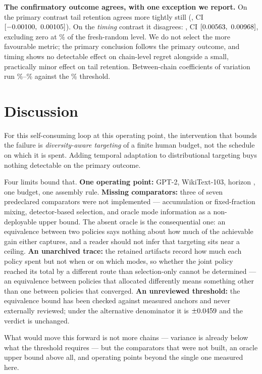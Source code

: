 \documentclass{article}
\begin{document}
\textbf{The confirmatory outcome agrees, with one exception we report.} On the primary
contrast tail retention agrees more tightly still (\PilotTailPrimaryMean{},
CI $[\PilotTailPrimaryLow,\allowbreak\ \PilotTailPrimaryHigh]$). On the \emph{timing}
contrast it disagrees: \PilotTailSchedRandMean{},
CI $[\PilotTailSchedRandLow,\allowbreak\ \PilotTailSchedRandHigh]$, excluding zero at
\PilotTailSchedRandPct\% of the fresh-random level. We do not select the more favourable
metric; the primary conclusion follows the primary outcome, and timing shows no detectable
effect on chain-level regret alongside a small, practically minor effect on tail retention.
Between-chain coefficients of variation run \PilotCVLow\%--\PilotCVHigh\% against the
\PilotThresholdPct\% threshold.

\section{Discussion}
\label{sec:discussion}

For this self-consuming loop at this operating point, the intervention that bounds the
failure is \emph{diversity-aware targeting} of a finite human budget, not the schedule on
which it is spent. Adding temporal adaptation to distributional targeting buys nothing
detectable on the primary outcome.

Four limits bound that. \textbf{One operating point:} GPT-2, WikiText-103, horizon
\PilotHorizon{}, one budget, one assembly rule. \textbf{Missing comparators:} three of seven
predeclared comparators were not implemented --- accumulation or fixed-fraction mixing,
detector-based selection, and oracle mode information as a non-deployable upper bound. The
absent oracle is the consequential one: an equivalence between two policies says nothing
about how much of the achievable gain either captures, and a reader should not infer that
targeting sits near a ceiling. \textbf{An unarchived trace:} the retained artifacts record
how much each policy spent but not when or on which modes, so whether the joint policy
reached its total by a different route than selection-only cannot be determined --- an
equivalence between policies that allocated differently means something other than one
between policies that converged. \textbf{An unreviewed threshold:} the equivalence bound has
been checked against measured anchors and never externally reviewed; under the alternative
denominator it is $\pm0.0459{}$ and the verdict is unchanged.

What would move this forward is not more chains --- variance is already below what the
threshold requires --- but the comparators that were not built, an oracle upper bound above
all, and operating points beyond the single one measured here.







\end{document}
